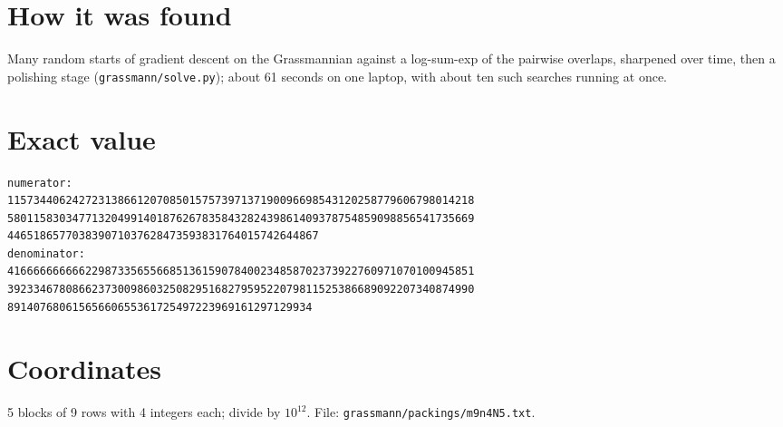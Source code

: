 \documentclass[11pt,a4paper]{article}
\begin{document}
\section{How it was found}
Many random starts of gradient descent on the Grassmannian against a log-sum-exp of the pairwise overlaps, sharpened over time, then a polishing stage (\texttt{grassmann/solve.py}); about 61 seconds on one laptop, with about ten such searches running at once.


\appendix
\section{Exact value}
{\small
\begin{verbatim}
numerator:
115734406242723138661207085015757397137190096698543120258779606798014218
580115830347713204991401876267835843282439861409378754859098856541735669
446518657703839071037628473593831764015742644867
denominator:
416666666666229873356556685136159078400234858702373922760971070100945851
392334678086623730098603250829516827959522079811525386689092207340874990
89140768061565660655361725497223969161297129934
\end{verbatim}}

\section{Coordinates}
5 blocks of 9 rows with 4 integers each; divide by $10^{12}$. File: \texttt{grassmann/packings/m9n4N5.txt}.
{\tiny
\begin{multicols}{3}
\end{multicols}}
\end{document}
